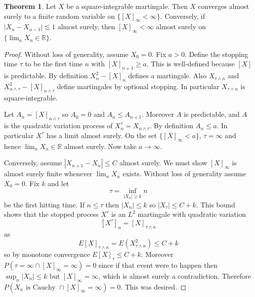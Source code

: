 \documentclass[12pt]{book}
\newcommand{\RR}{\mathbb{R}}
\theoremstyle{definition}
\newtheorem{theorem}{Theorem}[chapter]
\begin{document}
\begin{theorem}
Let $X$ be a square-integrable martingale.
Then $X$ converges almost surely to a finite random variable on $\{[X]_\infty < \infty\}$.
Conversely, if $|X_n - X_{n-1}| \lesssim 1$ almost surely, then $[X]_\infty < \infty$ almost surely on $\{\lim_n X_n \in \RR\}$.
\end{theorem}
\begin{proof}
Without loss of generality, assume $X_0 = 0$.
Fix $a > 0$.
Define the stopping time $\tau$ to be the first time $n$ with $[X]_{n+1} \geq a$.
This is well-defined because $[X]$ is predictable.
By definition $X_n^2 - [X]_n$ defines a martingale.
Also $X_{\tau \wedge n}$ and $X_{n \wedge \tau}^2 - [X]_{n \wedge \tau}$ define martingales by optional stopping.
In particular $X_{\tau \wedge n}$ is square-integrable.

Let $A_n = [X]_{n \wedge \tau}$ so $A_0 = 0$ and $A_n \leq A_{n+1}$.
Moreover $A$ is predictable, and $A$ is the quadratic variation process of $X^\tau_n = X_{n \wedge \tau}$.
By definition $A_n \leq a$.
In particular $X^\tau$ has a limit almost surely.
On the set $\{[X]_\infty < a\}$, $\tau = \infty$ and hence $\lim_n X_n \in \RR$ almost surely.
Now take $a \to \infty$.

Conversely, assume $|X_{n+1} - X_n| \leq C$ almost surely.
We must show $[X]_\infty$ is almost surely finite whenever $\lim_n X_n$ exists.
Without loss of generality assume $X_0 = 0$.
Fix $k$ and let
$$\tau = \inf_{|X_n| \geq k} n$$
be the first hitting time.
If $n \leq \tau$ then $|X_n| \leq k$ so $|X_\tau| \leq C + k$.
This bound shows that the stopped process $X^\tau$ is an $L^2$ martingale with quadratic variation
$$[X^\tau]_n = [X]_{\tau \wedge n}$$
as
$$E[X]_{\tau \wedge n} = E(X^2_{\tau \wedge n}) \leq C + k$$
so by monotone convergence $E[X]_\tau \leq C + k$.
Moreover $P(\tau = \infty \cap [X]_\infty = \infty) = 0$ since if that event were to happen then $\sup_n |X_n| \leq k$ but $[X]_\infty = \infty$, which is almost surely a contradiction.
Therefore $P(X_n \text{ is Cauchy } \cap [X]_\infty = \infty) = 0$.
This was desired.
\end{proof}
\end{document}
